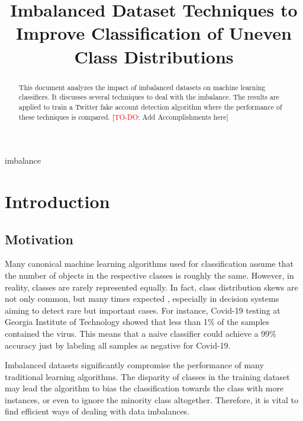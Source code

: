 \documentclass[conference]{IEEEtran}
\begin{document}
\title{Imbalanced Dataset Techniques to Improve Classification of Uneven Class Distributions\\
}

\author{
\and
{}
\and
{}
}

\maketitle

\begin{abstract}
This document analyzes the impact of imbalanced datasets on machine learning classifiers. It discusses several techniques to deal with the imbalance. The results are applied to train a Twitter fake account detection algorithm where the performance of these techniques is compared. 
[\textcolor{red}{TO-DO}: Add Accomplishments here]
\end{abstract}

\begin{IEEEkeywords}
imbalance
\end{IEEEkeywords}

\section{Introduction}
	\subsection{Motivation}
	Many canonical machine learning algorithms used for classification assume that the number of objects in the respective classes is roughly the same. However, in reality, classes are rarely represented equally. In fact, class distribution skews are not only common, but many times expected \cite{data_imbalance_overview}, especially in decision systems aiming to detect rare but important cases. For instance, Covid-19 testing at Georgia Institute of Technology showed that less than 1\% of the samples contained the virus. This means that a naive classifier could achieve a 99\% accuracy just by labeling all samples as negative for Covid-19.
	
Imbalanced datasets significantly compromise the performance of many traditional learning algorithms. The disparity of classes in the training dataset may lead the algorithm to bias the classification towards the class with more instances, or even to ignore the minority class altogether. Therefore, it is vital to find efficient ways of dealing with data imbalances.
\end{document}
